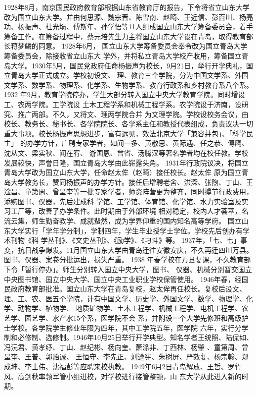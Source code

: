 \documentclass{sduthesis}
\begin{document}
1928年8月，南京国民政府教育部根据山东省教育厅的报告，下令将省立山东大学改为国立山东大学。并由何思源、魏宗晋、陈雪南、赵畸、王近信、彭百川、杨亮功、杨振声、杜光埙、傅斯年、孙学悟等11人组成国立山东大学筹备委员会，着手筹备工作。在筹备过程中，蔡元培先生力主将国立山东大学设在青岛，取得教育部长蒋梦麟的同意。 1928年6月， 国立山东大学筹备委员会奉令改为国立青岛大学筹备委员会，除接收省立山东大 学外，并将私立青岛大学校产收用，筹备国立青岛大学。1930年5月，国民党政府任命杨振声为校长，9月21日，举行开学典礼，国立青岛大学正式成立。学校初设文、 理、教育三个学院，分为中国文学系、外国文学系、数学系、物理系、化学系、生物学系、教育行政系和乡村教育系八个系。1932 年9月，教育学院停办，学生大部分转入国立中央大学教育学院。同时增设工、农两学院。工学院设 土木工程学系和机械工程学系。农学院设于济南，设研究、推广两部。不久，又将文、理两学院合并 为文理学院。学校设校务会议，由校长、教务长、秘书长、各学院院长、各学系主任和教授代表组成，负责议决一切重大事项。校长杨振声思想进步，富有远见，效法北京大学「兼容并包」、「科学民主」 的办学方针，广聘专家学者，如闻一多、黄敬思、黄际遇、任之恭、傅鹰、沈从文、梁实秋、闻在宥、 游国恩、曾省、汤腾汉等著名学者均在校任教。学校发展较快，声誉日隆，国立青岛大学由此崭露头角。 1931年行政院议决，将国立青岛大学改为国立山东大学，任命赵太侔（赵畸）接任校长。赵太侔 原为国立青岛大学教务长，赞同杨振声的办学方针。接任后增聘老舍、洪深、张煦、丁山、王淦昌、童第周、曾呈奎等一批专家学者，师资阵营更为整齐，同时撙节行政费用，添购图书、仪器，先后建成科 学馆、工学馆、体育馆、化学馆、水力实验室及实习工厂等，改善了办学条件。此时期由于外部环境 相对稳定，校内人才荟萃，名流云集，师生勤奋教学、成就蜚然，成为学界仰重的国内知名高等学府。 国立山东大学实行「学年学分制」，学制四年，学生毕业授学士学位。学校先后创办有学术刊物《科 学丛刊》、《文史丛刊》、《励学》、《刁斗》等。 1937年，「七、七」事变，抗日战争爆发。11月国立山东大学由青岛迁往安徽安庆，不久再迁四川万县。图书、仪器、案卷分批运出，损失严重。 1938 年春学校在万县复课，不久教育部下令「暂行停办」。师生分别转入国立中央大学，图书、 仪器、机械分别暂交国立中央图书馆、国立中央大学、国立中央工业职业学校保管使用。 1946年春，经国民政府教育部批准。国立山东大学在青岛复校，赵太侔再任校长。复校后设文、 理、工、农、医五个学院，计有中国文学、历史学、外国文学、数学、物理学、化学、动物学、植物学、 地质矿物学、土木工程学、机械工程学、电机工程学、农艺学、园艺学、水产水15个系，医学院不会 系，并附设一个大学先修班和高级护士学校。各学院学生修业年限为四年，其中工学院五年，医学院 六年，实行分学制和必修制、选修制。1946年10月25日举行开学典型。知名学者王统照、陆侃如、 冯沅君、黄孝纾、丁山、赵纪彬、杨向奎、萧涤非、丁西林、杨肇 、童第周、曾呈奎、王普、郭贻诚、 王恒守、李先正、刘遵宪、朱树屏、严效复、杨宗翰、郑成坤、李士伟、沈福彭等应聘来校执教。 1949年6月2日青岛解放、王哲、罗竹风、高剑秋率领军管小组进校，对学校进行接管整顿，山 东大学从此进入新的时期。
\end{document}
